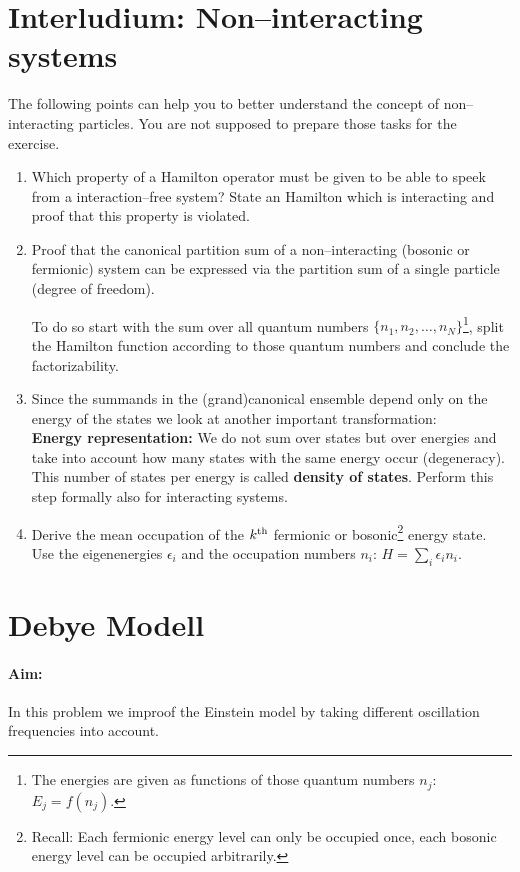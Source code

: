 \documentclass[12pt,a4paper]{article} %
\begin{document}
\section*{Interludium: Non--interacting systems}

 The following points can help you to better understand the concept of non--interacting particles. You are not supposed to prepare those tasks for the exercise.
 \begin{enumerate}
 \item Which property of a Hamilton operator must be given to be able to speek from a interaction--free system? State an Hamilton which is interacting and proof that this property is violated.
 \item Proof that the canonical partition sum of a non--interacting (bosonic or fermionic) system can be expressed via the partition sum of a single particle (degree of freedom). 
 
 To do so start with the sum over all quantum numbers $\{n_1, n_2, \dots, n_N\}$\footnote{The energies are given as functions of those quantum numbers $n_j$: $E_j = f(n_j)$.}, split the Hamilton function according to those quantum numbers and conclude the factorizability.
 
 \item Since the summands in the (grand)canonical ensemble depend only on the energy of the states we look at another important transformation:\\
 \textbf{Energy representation:}
 We do not sum over states but over energies and take into account how many states with the same energy occur (degeneracy). This number of states per energy is called \textbf{density of states}. Perform this step formally also for interacting systems.
 
  \item Derive the mean occupation of the $k^{\textnormal{th}}$ fermionic or bosonic\footnote{Recall: Each fermionic energy level can only be occupied once, each bosonic energy level can be occupied arbitrarily.} energy state. Use the eigenenergies $\epsilon_i$ and the occupation numbers $n_i$: $H = \sum_i \epsilon_i n_i$.
  \end{enumerate}


 \section{Debye Modell}
 \paragraph{Aim:} In this problem we improof the Einstein model by taking different oscillation frequencies into account. 
\end{document}

